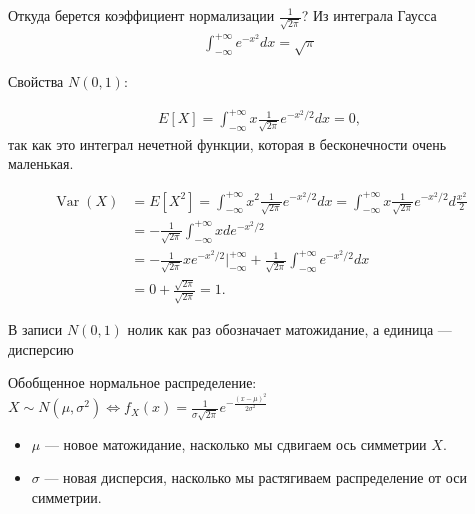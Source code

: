 \documentclass[12pt]{article}
\DeclareMathOperator{\Var}{Var}
\begin{document}
  Откуда берется коэффициент нормализации $\frac{1}{\sqrt{2\pi}}$? Из интеграла Гаусса
  \begin{align*}
    \int_{-\infty}^{+\infty} e^{-x^2} dx = \sqrt{\pi}
  \end{align*}

  Свойства $N(0, 1)$:

  \begin{align*}
    E[X] = \int_{-\infty}^{+\infty} x \frac{1}{\sqrt{2\pi}}e^{-x^2/2} dx = 0,
  \end{align*}
  так как это интеграл нечетной функции, которая в бесконечности очень маленькая.

  \begin{align*}
    \Var(X) &= E[X^2] = \int_{-\infty}^{+\infty} x^2 \frac{1}{\sqrt{2\pi}}e^{-x^2/2} dx = \int_{-\infty}^{+\infty} x \frac{1}{\sqrt{2\pi}}e^{-x^2/2}d\frac{x^2}{2} \\
            &= - \frac{1}{\sqrt{2\pi}} \int_{-\infty}^{+\infty} x de^{-x^2/2} \\
            &= - \frac{1}{\sqrt{2\pi}} x e^{-x^2/2} \bigg|_{-\infty}^{+\infty} + \frac{1}{\sqrt{2\pi}} \int_{-\infty}^{+\infty} e^{-x^2/2} dx \\
            &= 0 + \frac{\sqrt{2\pi}}{\sqrt{2\pi}} = 1.
  \end{align*}

  В записи $N(0, 1)$ нолик как раз обозначает матожидание, а единица --- дисперсию

  Обобщенное нормальное распределение: $X \sim N(\mu, \sigma^2) \Leftrightarrow f_X(x) = \frac{1}{\sigma\sqrt{2\pi}}e^{-\frac{(x - \mu)^2}{2\sigma^2}}$

  \begin{itemize}
    \item $\mu$ --- новое матожидание, насколько мы сдвигаем ось симметрии $X$.
    \item $\sigma$ --- новая дисперсия, насколько мы растягиваем распределение от оси симметрии.
  \end{itemize}

  \begin{center}
  \end{center}
  
\end{document}
